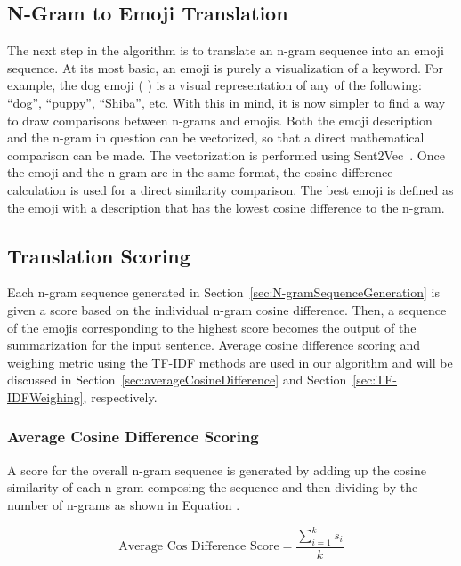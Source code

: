 \documentclass{article}[10]
\newcommand*{\img}[1]{%
  \raisebox{-.3\baselineskip}{%
    \texttt{[image: \#1]}%
  }%
}
\begin{document}
\subsection{N-Gram to Emoji Translation\label{sec:n-gramToEmojiTranslation}}

The next step in the algorithm is to translate an n-gram sequence into
an emoji sequence. At its most basic, an emoji is purely a visualization
of a keyword. For example, the dog emoji (\img{emojis/1f415.png}) is a visual representation
of any of the following: ``dog'', ``puppy'', ``Shiba'', etc. With this
in mind, it is now simpler to find a way to draw comparisons between
n-grams and emojis. Both the emoji description and the n-gram in
question can be vectorized, so that a direct mathematical comparison can
be made. The vectorization is performed using
Sent2Vec~\cite{pg2017unsu}. Once the emoji and the n-gram are in the
same format, the cosine difference calculation is used for a direct
similarity comparison. The best emoji is defined as the emoji with a
description that has the lowest cosine difference to the n-gram.

\subsection{Translation Scoring\label{sec:translationScoring}}

Each n-gram sequence generated in
Section~\ref{sec:N-gramSequenceGeneration} is given a score based on the
individual n-gram cosine difference. Then, a sequence of the emojis
corresponding to the highest score becomes the output of the
summarization for the input sentence. Average cosine difference scoring
and weighing metric using the TF-IDF methods are used in our algorithm
and will be discussed in Section~\ref{sec:averageCosineDifference} and
Section~\ref{sec:TF-IDFWeighing}, respectively.

\subsubsection{Average Cosine Difference Scoring\label{sec:averageCosineDifference}}

A score for the overall n-gram sequence is generated by adding up the
cosine similarity of each n-gram composing the sequence and then
dividing by the number of n-grams as shown in Equation .

\begin{equation}
   \textrm{Average Cos Difference Score} = \frac{\sum_{i=1}^{k}s_{i}}{k} \label{eq:averageCosineDifference}
\end{equation}
\end{document}

